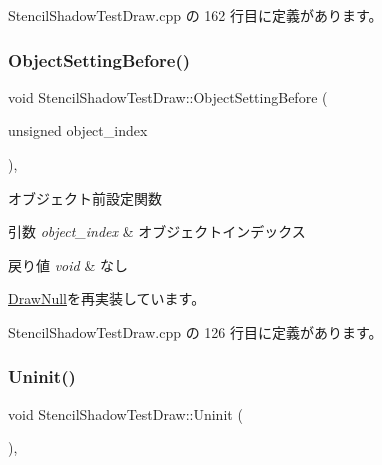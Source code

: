  Stencil\+Shadow\+Test\+Draw.\+cpp の 162 行目に定義があります。

\mbox{\label{class_stencil_shadow_test_draw_ab798b88896ba3f0b3de057dff49823be}} 
\subsubsection{\texorpdfstring{Object\+Setting\+Before()}{ObjectSettingBefore()}}
{\footnotesize\ttfamily void Stencil\+Shadow\+Test\+Draw\+::\+Object\+Setting\+Before (\begin{DoxyParamCaption}\item[{unsigned}]{object\+\_\+index }\end{DoxyParamCaption})\hspace{0.3cm}{\ttfamily [override]}, {\ttfamily [virtual]}}



オブジェクト前設定関数 


\begin{DoxyParams}{引数}
{\em object\+\_\+index} & オブジェクトインデックス \\
\hline
\end{DoxyParams}

\begin{DoxyRetVals}{戻り値}
{\em void} & なし \\
\hline
\end{DoxyRetVals}


\mbox{\hyperlink{class_draw_null_ac79a0adfc83537d5e677851463bb3028}{Draw\+Null}}を再実装しています。



 Stencil\+Shadow\+Test\+Draw.\+cpp の 126 行目に定義があります。

\mbox{\label{class_stencil_shadow_test_draw_ad0672bf4ecfc8091cf54ed6f2c76b618}} 
\subsubsection{\texorpdfstring{Uninit()}{Uninit()}}
{\footnotesize\ttfamily void Stencil\+Shadow\+Test\+Draw\+::\+Uninit (\begin{DoxyParamCaption}{ }\end{DoxyParamCaption})\hspace{0.3cm}{\ttfamily [override]}, {\ttfamily [virtual]}}



